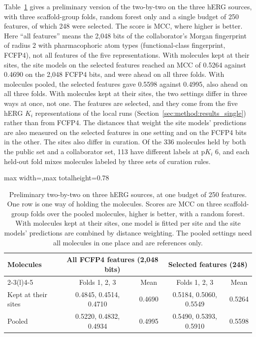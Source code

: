 Table~\ref{tab:prelim_sites} gives a preliminary version of the two-by-two on the three hERG sources, with three scaffold-group folds, random forest only and a single budget of 250 features, of which 248 were selected. The score is MCC, where higher is better. Here ``all features'' means the 2,048 bits of the collaborator's Morgan fingerprint of radius 2 with pharmacophoric atom types (functional-class fingerprint, FCFP4), not all features of the five representations. With molecules kept at their sites, the site models on the selected features reached an MCC of 0.5264 against 0.4690 on the 2,048 FCFP4 bits, and were ahead on all three folds. With molecules pooled, the selected features gave 0.5598 against 0.4995, also ahead on all three folds. With molecules kept at their sites, the two settings differ in three ways at once, not one. The features are selected, and they come from the five hERG $K_i$ representations of the local runs (Section~\ref{sec:method:results_single}) rather than from FCFP4. The distances that weight the site models' predictions are also measured on the selected features in one setting and on the FCFP4 bits in the other. The sites also differ in curation. Of the 336 molecules held by both the public set and a collaborator set, 113 have different labels at p$K_i$ 6, and each held-out fold mixes molecules labeled by three sets of curation rules.

\begin{table}[htbp]
\centering
\small
\begin{adjustbox}{max width=\textwidth,max totalheight=0.78\textheight}
\begin{tabular}{@{}lcccc@{}}
\toprule
Molecules & \multicolumn{2}{c}{All FCFP4 features (2,048 bits)} & \multicolumn{2}{c}{Selected features (248)} \\
\cmidrule(lr){2-3}\cmidrule(l){4-5}
 & Folds 1, 2, 3 & Mean & Folds 1, 2, 3 & Mean \\
\midrule
Kept at their sites & 0.4845, 0.4514, 0.4710 & 0.4690 & 0.5184, 0.5060, 0.5549 & 0.5264 \\
Pooled & 0.5220, 0.4832, 0.4934 & 0.4995 & 0.5490, 0.5393, 0.5910 & 0.5598 \\
\bottomrule
\end{tabular}
\end{adjustbox}
\caption[Preliminary: feature selection with molecules kept at three hERG sources.]{Preliminary two-by-two on three hERG sources, at one budget of 250 features. One row is one way of holding the molecules. Scores are MCC on three scaffold-group folds over the pooled molecules, higher is better, with a random forest. With molecules kept at their sites, one model is fitted per site and the site models' predictions are combined by distance weighting. The pooled settings need all molecules in one place and are references only.}
\label{tab:prelim_sites}
\end{table}


